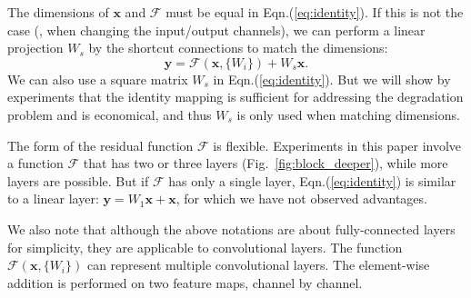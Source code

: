 \documentclass[10pt,twocolumn,letterpaper]{article}
\newcommand{\ve}[1]{\mathbf{#1}} %
\begin{document}
The dimensions of $\ve{x}$ and $\mathcal{F}$ must be equal in Eqn.(\ref{eq:identity}). If this is not the case (\eg, when changing the input/output channels), we can perform a linear projection $W_{s}$ by the shortcut connections to match the dimensions:
\begin{equation}\label{eq:transform}
  \ve{y}= \mathcal{F}(\ve{x}, \{W_{i}\}) + W_{s}\ve{x}.
\end{equation}
We can also use a square matrix $W_{s}$ in Eqn.(\ref{eq:identity}). But we will show by experiments that the identity mapping is sufficient for addressing the degradation problem and is economical, and thus $W_{s}$ is only used when matching dimensions.

The form of the residual function $\mathcal{F}$ is flexible. Experiments in this paper involve a function $\mathcal{F}$ that has two or three layers (Fig.~\ref{fig:block_deeper}), while more layers are possible. But if $\mathcal{F}$ has only a single layer, Eqn.(\ref{eq:identity}) is similar to a linear layer: $\ve{y}=W_1\ve{x}+\ve{x}$, for which we have not observed advantages.

We also note that although the above notations are about fully-connected layers for simplicity, they are applicable to convolutional layers. The function $\mathcal{F}(\ve{x}, \{W_{i}\})$ can represent multiple convolutional layers. The element-wise addition is performed on two feature maps, channel by channel.
\end{document}
